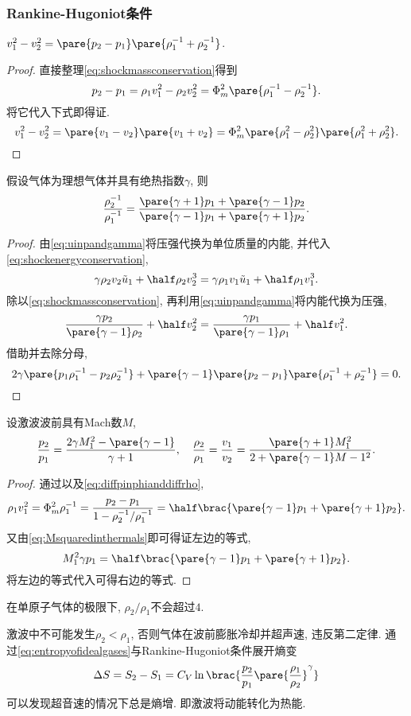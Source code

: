 \documentclass[../Thermal.tex]{subfiles}
\begin{document}
\subsubsection{Rankine-Hugoniot条件}
\begin{lemma}
\label{lem:RHconditionLemma1}
$v_1^2 - v_2^2 = \pare{p_2 - p_1}\pare{\rho_1^{-1} + \rho_2^{-1}}$.
\end{lemma}
\begin{proof}
直接整理\eqref{eq:shockmassconservation}得到
\begin{equation}
\label{eq:diffpinphianddiffrho}
p_2 - p_1 = \rho_1 v_1^2 - \rho_2 v_2^2 = \Phi_m^2\pare{\rho_1^{-1} - \rho_2^{-1}}.
\end{equation}
将它代入下式即得证.
\[ v_1^2 - v_2^2 = \pare{v_1 - v_2}\pare{v_1 + v_2} = \Phi_m^2\pare{\rho_1^2 - \rho_2^2}\pare{\rho_1^2 + \rho_2^2}.  \qedhere \]
\end{proof}
\begin{lemma}
\label{lem:RHconditionLemma2}
假设气体为理想气体并具有绝热指数$\gamma$, 则
\[ \frac{\rho_2^{-1}}{\rho_1^{-1}} = \frac{\pare{\gamma+1}p_1+\pare{\gamma-1}p_2}{\pare{\gamma-1}p_1+\pare{\gamma+1}p_2}. \]
\end{lemma}
\begin{proof}
由\eqref{eq:uinpandgamma}将压强代换为单位质量的内能, 并代入\eqref{eq:shockenergyconservation},
\[ \gamma\rho_2v_2\tilde{u}_1 + \half\rho_2v_2^3 = \gamma\rho_1v_1\tilde{u}_1 + \half\rho_1v_1^3. \]
除以\eqref{eq:shockmassconservation}, 再利用\eqref{eq:uinpandgamma}将内能代换为压强,
\[ \frac{\gamma p_2}{\pare{\gamma - 1}\rho_2} + \half v_2^2 = \frac{\gamma p_1}{\pare{\gamma - 1}\rho_1} + \half v_1^2. \]
借助并去除分母,
\[ 2\gamma\pare{p_1\rho_1^{-1} - p_2\rho_2^{-1}} + \pare{\gamma - 1}\pare{p_2 - p_1}\pare{\rho_1^{-1} + \rho_2^{-1}} = 0. \qedhere \]
\end{proof}
\begin{finale}
\begin{theorem}
设激波波前具有Mach数$M$,
\[ \frac{p_2}{p_1} = \frac{2\gamma M_1^2 - \pare{\gamma - 1}}{\gamma + 1},\quad \frac{\rho_2}{\rho_1} = \frac{v_1}{v_2} = \frac{\pare{\gamma + 1}M_1^2}{2+\pare{\gamma - 1}M-1^2}. \]
\end{theorem}
\end{finale}
\begin{proof}
通过以及\eqref{eq:diffpinphianddiffrho},
\[ \rho_1 v_1^2 = \Phi_m^2\rho_1^{-1} = \frac{p_2 - p_1}{1 - \rho_2^{-1}/\rho_1^{-1}} = \half \brac{\pare{\gamma - 1}p_1 + \pare{\gamma + 1}p_2}. \]
又由\eqref{eq:Msquaredinthermals}即可得证左边的等式,
\[ M_1^2 \gamma p_1 = \half \brac{\pare{\gamma - 1}p_1 + \pare{\gamma + 1}p_2}. \]
将左边的等式代入可得右边的等式.
\end{proof}
\begin{ex}
在单原子气体的极限下, $\rho_2/\rho_1$不会超过$4$.
\end{ex}
激波中不可能发生$\rho_2<\rho_1$, 否则气体在波前膨胀冷却并超声速, 违反第二定律. 通过\eqref{eq:entropyofidealgases}与Rankine-Hugoniot条件展开熵变
\[ \Delta S = S_2 - S_1 = C_V \ln\brac{\frac{p_2}{p_1}\pare{\frac{\rho_1}{\rho_2}}^{\gamma}} \]
可以发现超音速的情况下总是熵增. 即激波将动能转化为热能.
\end{document}
